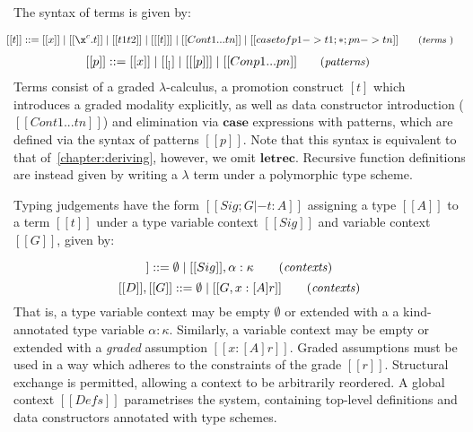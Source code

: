 The syntax of terms is given by:

\begin{align*}
        \hspace{-0.8em} [[ t ]] ::= \;
               & [[ x ]]
          \mid [[ \x ^ c . t ]]
          \mid [[ t1 t2 ]]
          \mid [[ [t] ]]
          \mid [[ Con t1 ... tn ]]
          \mid [[ case t of p1 -> t1 ; * ; pn -> tn  ]]
        {\small{\tag{\textit{terms} }}}
\end{align*}
\begin{align*}
  \vspace{-1em}
        \hspace{-0.8em} [[ p ]] ::= \;
               & [[ x ]]
          \mid [[ _ ]]
          \mid [[ [p] ]]
          \mid [[ Con p1 ... pn ]]
        {\small{\tag{\textit{patterns}}}}
\end{align*}
Terms consist of a graded $\lambda$-calculus, a promotion construct $[t]$ which
 introduces a graded modality explicitly, as well as data constructor
 introduction ($[[ Con t1 ... tn ]]$) and elimination via $\textbf{case}$
 expressions with patterns, which are defined via the syntax of patterns $[[ p
 ]]$. Note that this syntax is equivalent to that of~\ref{chapter:deriving},
 however, we omit $\textbf{letrec}$. Recursive function
 definitions are instead given by writing a $\lambda$ term under a polymorphic
 type scheme. 

Typing judgements have the form $[[  Sig ; G |- t : A ]]$ assigning a type $[[ A
]]$ to a term $ [[ t ]]$ under a type variable context $[[ Sig ]]$ and variable context
$[[ G ]]$, given by:

\begin{equation*}
  [[ Sig ]] ::= \emptyset
  \mid [[ Sig ]], \alpha : \kappa
\tag{\textit{contexts}}
\end{equation*}
\begin{equation*}
  \vspace{-1em}
  [[ D ]], [[ G ]] ::= \emptyset
  \mid [[ G , x : [ A ] r ]]
\tag{\textit{contexts}}
\end{equation*}
%
That is, a type variable context may be empty $\emptyset$ or extended with a a
kind-annotated type variable $\alpha : \kappa$. Similarly, a variable context
may be empty or extended with a \textit{graded} assumption $ [[ x : [A] r ]]$.
Graded assumptions must be used in a way which adheres to the constraints of the
grade $[[ r ]]$. Structural exchange is permitted, allowing a context to be
arbitrarily reordered. A global context $[[ Defs ]]$ parametrises the system,
containing top-level definitions and data constructors annotated with type
schemes. 

